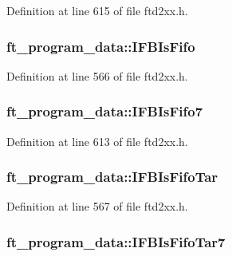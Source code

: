 Definition at line 615 of file ftd2xx.h.\hypertarget{structft__program__data_ad08f06af0e3a427cb6a826f55cc32ff5}{
\subsubsection[{IFBIsFifo}]{ {\bf ft\_\-program\_\-data::IFBIsFifo}}}
\label{structft__program__data_ad08f06af0e3a427cb6a826f55cc32ff5}


Definition at line 566 of file ftd2xx.h.\hypertarget{structft__program__data_a73fc4f0b76da0dee036714023f45418e}{
\subsubsection[{IFBIsFifo7}]{ {\bf ft\_\-program\_\-data::IFBIsFifo7}}}
\label{structft__program__data_a73fc4f0b76da0dee036714023f45418e}


Definition at line 613 of file ftd2xx.h.\hypertarget{structft__program__data_a1ed18c9dd5cc96d1ae96320ef2115b8b}{
\subsubsection[{IFBIsFifoTar}]{ {\bf ft\_\-program\_\-data::IFBIsFifoTar}}}
\label{structft__program__data_a1ed18c9dd5cc96d1ae96320ef2115b8b}


Definition at line 567 of file ftd2xx.h.\hypertarget{structft__program__data_a3c52ca4fac055f6710035176b61344a0}{
\subsubsection[{IFBIsFifoTar7}]{ {\bf ft\_\-program\_\-data::IFBIsFifoTar7}}}
\label{structft__program__data_a3c52ca4fac055f6710035176b61344a0}


